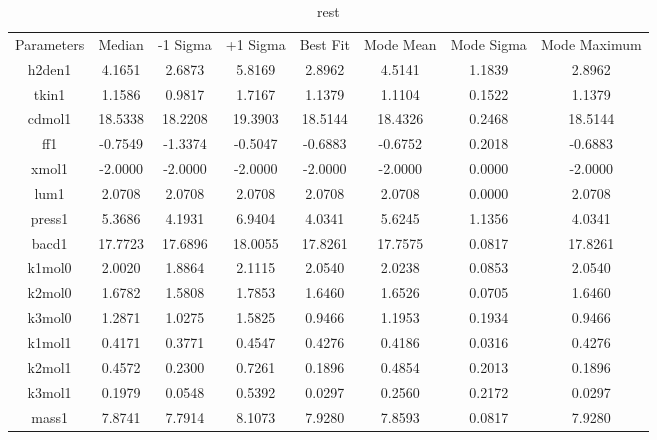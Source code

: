 \begin{table}
\caption{rest}
\begin{tabular}{cccccccc}
Parameters & Median & -1 Sigma & +1 Sigma & Best Fit & Mode Mean & Mode Sigma & Mode Maximum \\
h2den1 & 4.1651 & 2.6873 & 5.8169 & 2.8962 & 4.5141 & 1.1839 & 2.8962 \\
tkin1 & 1.1586 & 0.9817 & 1.7167 & 1.1379 & 1.1104 & 0.1522 & 1.1379 \\
cdmol1 & 18.5338 & 18.2208 & 19.3903 & 18.5144 & 18.4326 & 0.2468 & 18.5144 \\
ff1 & -0.7549 & -1.3374 & -0.5047 & -0.6883 & -0.6752 & 0.2018 & -0.6883 \\
xmol1 & -2.0000 & -2.0000 & -2.0000 & -2.0000 & -2.0000 & 0.0000 & -2.0000 \\
lum1 & 2.0708 & 2.0708 & 2.0708 & 2.0708 & 2.0708 & 0.0000 & 2.0708 \\
press1 & 5.3686 & 4.1931 & 6.9404 & 4.0341 & 5.6245 & 1.1356 & 4.0341 \\
bacd1 & 17.7723 & 17.6896 & 18.0055 & 17.8261 & 17.7575 & 0.0817 & 17.8261 \\
k1mol0 & 2.0020 & 1.8864 & 2.1115 & 2.0540 & 2.0238 & 0.0853 & 2.0540 \\
k2mol0 & 1.6782 & 1.5808 & 1.7853 & 1.6460 & 1.6526 & 0.0705 & 1.6460 \\
k3mol0 & 1.2871 & 1.0275 & 1.5825 & 0.9466 & 1.1953 & 0.1934 & 0.9466 \\
k1mol1 & 0.4171 & 0.3771 & 0.4547 & 0.4276 & 0.4186 & 0.0316 & 0.4276 \\
k2mol1 & 0.4572 & 0.2300 & 0.7261 & 0.1896 & 0.4854 & 0.2013 & 0.1896 \\
k3mol1 & 0.1979 & 0.0548 & 0.5392 & 0.0297 & 0.2560 & 0.2172 & 0.0297 \\
mass1 & 7.8741 & 7.7914 & 8.1073 & 7.9280 & 7.8593 & 0.0817 & 7.9280 \\
\end{tabular}
\end{table}
